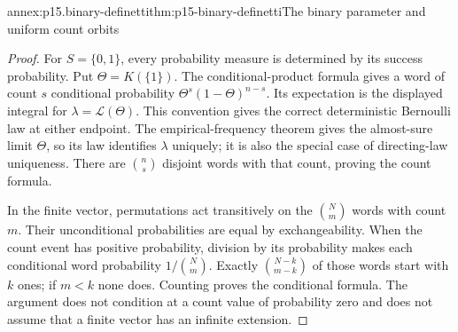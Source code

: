 \begin{annexitem}{annex:p15.binary-definetti}{thm:p15-binary-definetti}{The binary parameter and uniform count orbits}
\begin{proof}
For \(S=\{0,1\}\), every probability measure is determined by its
success probability. Put \(\Theta=K(\{1\})\).
The conditional-product formula gives a word of count \(s\)
conditional probability \(\Theta^s(1-\Theta)^{n-s}\).
Its expectation is the displayed integral for
\(\lambda=\mathcal L(\Theta)\).
This convention gives the correct deterministic Bernoulli law at
either endpoint. The empirical-frequency theorem gives the
almost-sure limit \(\Theta\), so its law identifies \(\lambda\)
uniquely; it is also the special case of directing-law uniqueness.
There are \(\binom ns\) disjoint words with that count, proving
the count formula.

In the finite vector, permutations act transitively on the
\(\binom Nm\) words with count \(m\). Their unconditional
probabilities are equal by exchangeability.
When the count event has positive probability, division by its
probability makes each conditional word probability \(1/\binom Nm\).
Exactly \(\binom{N-k}{m-k}\) of those words start with \(k\) ones;
if \(m<k\) none does. Counting proves the conditional formula.
The argument does not condition at a count value of probability zero
and does not assume that a finite vector has an infinite extension.
\end{proof}
\end{annexitem}

